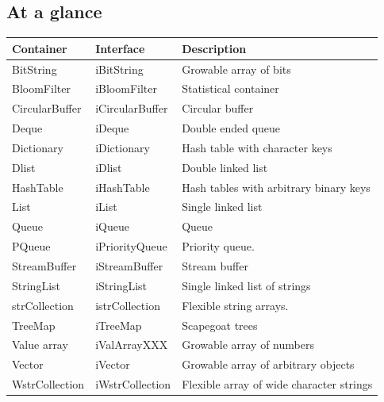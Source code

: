 \documentclass[12pt,a4paper]{memoir} %
\begin{document}
\subsection{At a glance}
{
\begin{center}
\noindent
\begin{longtable}{||p{3cm}|p{3cm}|p{7.0cm}||}
\hline
\textbf{Container}&\textbf{Interface}&\textbf{Description }\\\hline \hline
BitString&iBitString&Growable array of bits \\
BloomFilter&iBloomFilter&Statistical container \\
CircularBuffer&iCircularBuffer& Circular buffer \\
Deque&iDeque&Double ended queue \\
Dictionary&iDictionary&Hash table with character keys \\
Dlist&iDlist&Double linked list \\
HashTable&iHashTable&Hash tables with arbitrary binary keys \\
List&iList&Single linked list \\
Queue&iQueue&Queue \\
PQueue&iPriorityQueue&Priority queue. \\
StreamBuffer&iStreamBuffer&Stream buffer \\
StringList&iStringList&Single linked list of strings\\
strCollection&istrCollection&Flexible string arrays. \\
TreeMap&iTreeMap&Scapegoat trees \\
Value array&iValArrayXXX&Growable array of numbers \\
Vector&iVector&Growable array of arbitrary objects \\
WstrCollection&iWstrCollection&Flexible array of wide character strings\\
\hline
\end{longtable}
\end{center}
} %
\end{document}
